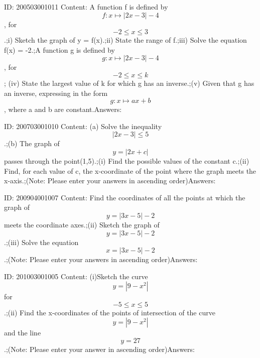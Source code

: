 \documentclass{article}
\begin{document}
ID: 200503001011
Content:
A function f is defined by $$f:x \mapsto |2x-3|-4$$, for $$-2\leq x\leq3$$.;i) Sketch the graph of y = f(x).;ii)	State the range of f.;iii) Solve the equation f(x) = -2.;A function g is defined by $$g:x \mapsto |2x-3|-4$$, for $$-2\leq x\leq k$$ ; (iv) State the largest value of k for which g has an inverse.;(v) Given that g has an inverse, expressing in the form $$g:x \mapsto ax+b$$, where a and b are constant.Answers:

ID: 200703001010
Content:
(a) Solve the inequality $$|2x-3|\leq5$$.;(b) The graph of $$y=|2x+c|$$ passes through the point(1,5).;(i) Find the possible values of the constant c.;(ii) Find, for each value of c, the x-coordinate of the point where the graph meets the x-axis.;(Note: Please enter your answers in ascending order)Answers:

ID: 200904001007
Content:
Find the coordinates of all the points at which the graph of $$y=|3x-5|-2$$ meets the coordinate axes.;(ii) Sketch the graph of $$y=|3x-5|-2$$.;(iii) Solve the equation $$x=|3x-5|-2$$.;(Note: Please enter your answers in ascending order)Answers:

ID: 201003001005
Content:
(i)Sketch the curve $$y = |9-x^2|$$ for $$-5\leq x\leq5$$.;(ii) Find the x-coordinates of the points of intersection of the curve $$y=|9-x^2|$$ and the line $$y=27$$.;(Note: Please enter your answer in ascending order)Answers:
\end{document}
